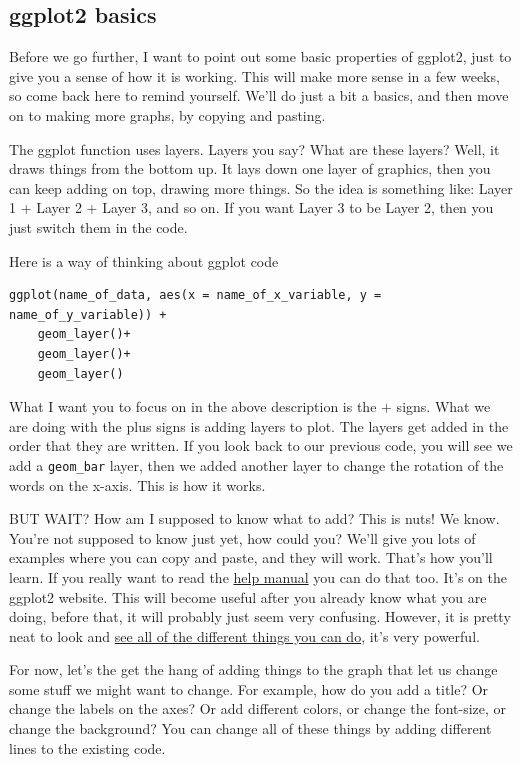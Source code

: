 \documentclass[]{book}
\theoremstyle{definition}
\theoremstyle{definition}
\theoremstyle{definition}
\theoremstyle{remark}
\begin{document}
\subsection{ggplot2 basics}\label{ggplot2-basics}

Before we go further, I want to point out some basic properties of
ggplot2, just to give you a sense of how it is working. This will make
more sense in a few weeks, so come back here to remind yourself. We'll
do just a bit a basics, and then move on to making more graphs, by
copying and pasting.

The ggplot function uses layers. Layers you say? What are these layers?
Well, it draws things from the bottom up. It lays down one layer of
graphics, then you can keep adding on top, drawing more things. So the
idea is something like: Layer 1 + Layer 2 + Layer 3, and so on. If you
want Layer 3 to be Layer 2, then you just switch them in the code.

Here is a way of thinking about ggplot code

\begin{verbatim}
ggplot(name_of_data, aes(x = name_of_x_variable, y = name_of_y_variable)) +
    geom_layer()+
    geom_layer()+
    geom_layer()
\end{verbatim}

What I want you to focus on in the above description is the \(+\) signs.
What we are doing with the plus signs is adding layers to plot. The
layers get added in the order that they are written. If you look back to
our previous code, you will see we add a \texttt{geom\_bar} layer, then
we added another layer to change the rotation of the words on the
x-axis. This is how it works.

BUT WAIT? How am I supposed to know what to add? This is nuts! We know.
You're not supposed to know just yet, how could you? We'll give you lots
of examples where you can copy and paste, and they will work. That's how
you'll learn. If you really want to read the
\href{https://ggplot2.tidyverse.org/reference/index.html}{help manual}
you can do that too. It's on the ggplot2 website. This will become
useful after you already know what you are doing, before that, it will
probably just seem very confusing. However, it is pretty neat to look
and \href{http://www.ggplot2-exts.org/gallery/}{see all of the different
things you can do}, it's very powerful.

For now, let's the get the hang of adding things to the graph that let
us change some stuff we might want to change. For example, how do you
add a title? Or change the labels on the axes? Or add different colors,
or change the font-size, or change the background? You can change all of
these things by adding different lines to the existing code.
\end{document}
